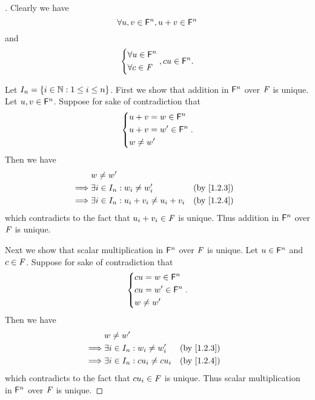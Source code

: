 \begin{proof}[]
	Clearly we have
	\[
		\forall u, v \in \mathsf{F}^n, u + v \in \mathsf{F}^n
	\]
	and
	\[
		\begin{dcases}
			\forall u \in \mathsf{F}^n \\
			\forall c \in \mathit{F}
		\end{dcases}, cu \in \mathsf{F}^n.
	\]

	Let \(I_n = \left\lbrace i \in \mathbb{N} : 1 \leq i \leq n\right\rbrace\).
	First we show that addition in \(\mathsf{F}^n\) over \(\mathit{F}\) is unique.
	Let \(u, v \in \mathsf{F}^n\).
	Suppose for sake of contradiction that
	\[
		\begin{dcases}
			u + v = w \in \mathsf{F}^n  \\
			u + v = w' \in \mathsf{F}^n \\
			w \neq w'
		\end{dcases}.
	\]
	Then we have
	\begin{align*}
		         & w \neq w'                                                                  \\
		\implies & \exists i \in I_n : w_i \neq w_i'            &  & \by{1.2.3}               \\
		\implies & \exists i \in I_n : u_i + v_i \neq u_i + v_i &  & \text{(by \cref{1.2.4})}
	\end{align*}
	which contradicts to the fact that \(u_i + v_i \in \mathit{F}\) is unique.
	Thus addition in \(\mathsf{F}^n\) over \(\mathit{F}\) is unique.

	Next we show that scalar multiplication in \(\mathsf{F}^n\) over \(\mathit{F}\) is unique.
	Let \(u \in \mathsf{F}^n\) and \(c \in \mathit{F}\).
	Suppose for sake of contradiction that
	\[
		\begin{dcases}
			cu = w \in \mathsf{F}^n  \\
			cu = w' \in \mathsf{F}^n \\
			w \neq w'
		\end{dcases}.
	\]
	Then we have
	\begin{align*}
		         & w \neq w'                                                          \\
		\implies & \exists i \in I_n : w_i \neq w_i'    &  & \text{(by \cref{1.2.3})} \\
		\implies & \exists i \in I_n : c u_i \neq c u_i &  & \text{(by \cref{1.2.4})}
	\end{align*}
	which contradicts to the fact that \(c u_i \in \mathit{F}\) is unique.
	Thus scalar multiplication in \(\mathsf{F}^n\) over \(\mathit{F}\) is unique.


\end{proof}
